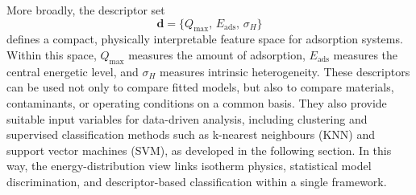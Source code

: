 \documentclass[journal=jacsat,manuscript=article]{achemso}
\begin{document}
	More broadly, the descriptor set
	\begin{equation}
		\mathbf{d} = \{Q_{\max},\, E_{\mathrm{ads}},\, \sigma_H\}
		\label{eq:descriptor_bridge}
	\end{equation}
	defines a compact, physically interpretable feature space for adsorption systems. Within this space, $Q_{\max}$ measures the amount of adsorption, $E_{\mathrm{ads}}$ measures the central energetic level, and $\sigma_H$ measures intrinsic heterogeneity. These descriptors can be used not only to compare fitted models, but also to compare materials, contaminants, or operating conditions on a common basis. They also provide suitable input variables for data-driven analysis, including clustering and supervised classification methods such as k-nearest neighbours (KNN) and support vector machines (SVM), as developed in the following section. In this way, the energy-distribution view links isotherm physics, statistical model discrimination, and descriptor-based classification within a single framework.

\end{document}
